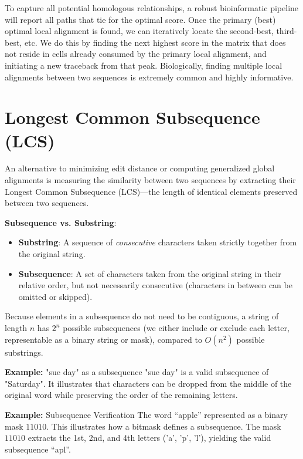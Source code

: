 To capture all potential homologous relationships, a robust bioinformatic pipeline will report all paths that tie for the optimal score. Once the primary (best) optimal local alignment is found, we can iteratively locate the second-best, third-best, etc. We do this by finding the next highest score in the matrix that does not reside in cells already consumed by the primary local alignment, and initiating a new traceback from that peak. Biologically, finding multiple local alignments between two sequences is extremely common and highly informative.


\section{Longest Common Subsequence (LCS)}
An alternative to minimizing edit distance or computing generalized global alignments is measuring the similarity between two sequences by extracting their Longest Common Subsequence (LCS)—the length of identical elements preserved between two sequences.

\begin{important}
  \textbf{Subsequence vs. Substring}: 
  \begin{itemize}
      \item \textbf{Substring}: A sequence of \textit{consecutive} characters taken strictly together from the original string. 
      \item \textbf{Subsequence}: A set of characters taken from the original string in their relative order, but not necessarily consecutive (characters in between can be omitted or skipped).
  \end{itemize}
\end{important}

Because elements in a subsequence do not need to be contiguous, a string of length \( n \) has \( 2^n \) possible subsequences (we either include or exclude each letter, representable as a binary string or mask), compared to $O(n^2)$ possible substrings.

\textbf{Example:} "sue day" as a subsequence
"sue day" is a valid subsequence of "Saturday". It illustrates that characters can be dropped from the middle of the original word while preserving the order of the remaining letters.

\textbf{Example:} Subsequence Verification
The word ``apple'' represented as a binary mask $11010$. This illustrates how a bitmask defines a subsequence. The mask $11010$ extracts the 1st, 2nd, and 4th letters ('a', 'p', 'l'), yielding the valid subsequence ``apl''.

